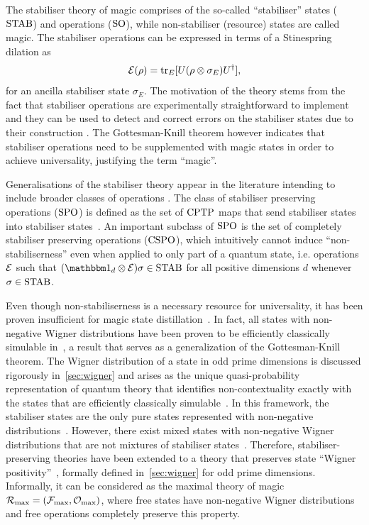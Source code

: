 \documentclass[pra,
aps,
twocolumn,
superscriptaddress,
groupedaddress,
nofootinbib,
reprint
]{revtex4-1}
\begin{document}
The stabiliser theory of magic comprises of the so-called ``stabiliser'' states (${\rm{STAB}}$) and operations (${\rm{SO}}$), while non-stabiliser (resource) states are called magic.
The stabiliser operations can be expressed in terms of a Stinespring dilation as 
\begin{equation}
    \mathcal{E}(\rho) = {\rm{tr}}_E [U(\rho \otimes \sigma_E)U^\dagger],
\end{equation} 
for an ancilla stabiliser state $\sigma_E$. 
The motivation of the theory stems from the fact that stabiliser operations are experimentally straightforward to implement and they can be used to detect and correct errors on the stabiliser states due to their construction .
The Gottesman-Knill theorem however indicates that stabiliser operations need to be supplemented with magic states in order to achieve universality, justifying the term ``magic''.

Generalisations of the stabiliser theory appear in the literature intending to include broader classes of operations .
The class of stabiliser preserving operations (${\rm{SPO}}$) is defined as the set of ${\rm{CPTP}}$ maps that send stabiliser states into stabiliser states~\cite{cit:ahmadi}.
An important subclass of ${\rm{SPO}}$ is the set of completely stabiliser preserving operations (${\rm{CSPO}}$), which intuitively cannot induce ``non-stabiliserness'' even when applied to only part of a quantum state, i.e. operations $\mathcal{E}$ such that $(\id_d \otimes \E ) \sigma \in \stab$ for all positive dimensions $d$ whenever $\sigma \in {\rm{STAB}}$.

Even though non-stabiliserness is a necessary resource for universality, it has been proven insufficient for magic state distillation~\cite{cit:bravyi, cit:campbell}.
In fact, all states with non-negative Wigner distributions have been proven to be efficiently classically simulable in~\cite{cit:mari}, a result that serves as a generalization of the Gottesman-Knill theorem.
The Wigner distribution of a state in odd prime dimensions is discussed rigorously in~\cref{sec:wigner} and arises as the unique quasi-probability representation of quantum theory that identifies non-contextuality exactly with the states that are efficiently classically simulable~\cite{cit:howard2, cit:veitch2}.
In this framework, the stabiliser states are the only pure states represented with non-negative distributions~\cite{cit:gross3}. 
However, there exist mixed states with non-negative Wigner distributions that are not mixtures of stabiliser states~\cite{cit:gross}.
Therefore, stabiliser-preserving theories have been extended to a theory that preserves state ``Wigner positivity''~\cite{Wang_2019}, formally defined in~\cref{sec:wigner} for odd prime dimensions.
Informally, it can be considered as the maximal theory of magic $\mathcal{R}_{\rm{max}} = (\mathcal{F}_{\rm{max}}, \mathcal{O}_{\rm{max}})$, where free states have non-negative Wigner distributions and free operations completely preserve this property.\\ 
\end{document}

